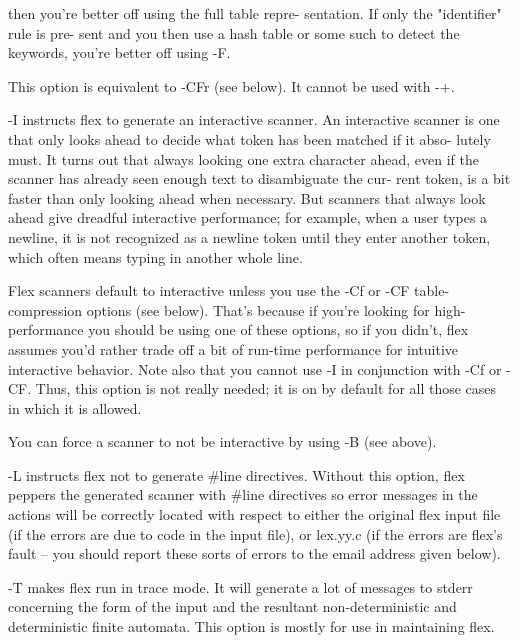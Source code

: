\documentclass[12pt,spanish,twocolumn,lettersize]{article}
\begin{document}
{	      then you're better off using the full table  repre-
	      sentation.   If  only the "identifier" rule is pre-
	      sent and you then use a hash table or some such  to
	      detect the keywords, you're better off using -F.

	      This  option is equivalent to -CFr (see below).  It
	      cannot be used with -+.

       -I     instructs flex to generate an interactive	 scanner.
	      An interactive scanner is one that only looks ahead
	      to decide what token has been matched if	it  abso-
	      lutely  must.  It turns out that always looking one
	      extra character ahead,  even  if	the  scanner  has
	      already  seen  enough text to disambiguate the cur-
	      rent token, is a bit faster than only looking ahead
	      when  necessary.	 But  scanners	that  always look
	      ahead give dreadful  interactive	performance;  for
	      example,	when  a	 user  types a newline, it is not
	      recognized as a  newline	token  until  they  enter
	      another  token, which often means typing in another
	      whole line.

	      Flex scanners default to interactive unless you use
	      the  -Cf	or  -CF	 table-compression  options  (see
	      below).  That's because if you're looking for high-
	      performance  you	should	be  using  one	of  these
	      options, so  if  you  didn't,  flex  assumes  you'd
	      rather  trade off a bit of run-time performance for
	      intuitive interactive behavior.  Note also that you
	      cannot  use  -I  in  conjunction	with  -Cf or -CF.
	      Thus, this option is not really needed; it is on by
	      default for all those cases in which it is allowed.

	      You can force a scanner to not  be  interactive  by
	      using -B (see above).

       -L     instructs	 flex  not  to generate #line directives.
	      Without this option,  flex  peppers  the	generated
	      scanner  with #line directives so error messages in
	      the actions will be correctly located with  respect
	      to  either  the  original	 flex  input file (if the
	      errors are due to	 code  in  the	input  file),  or
	      lex.yy.c	(if  the  errors  are flex's fault -- you
	      should report these sorts of errors  to  the  email
	      address given below).

       -T     makes  flex  run in trace mode.  It will generate a
	      lot of messages to stderr concerning  the	 form  of
	      the  input  and the resultant non-deterministic and
	      deterministic  finite  automata.	 This  option  is
	      mostly for use in maintaining flex.

}
\end{document}
